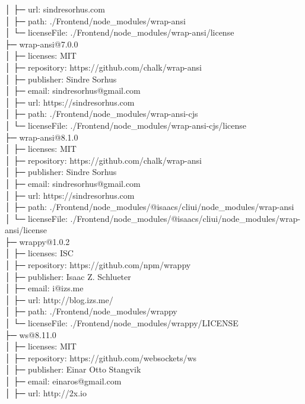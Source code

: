 │  ├─ url: sindresorhus.com\\
│  ├─ path: ./Frontend/node\_modules/wrap-ansi\\
│  └─ licenseFile: ./Frontend/node\_modules/wrap-ansi/license\\
├─ wrap-ansi@7.0.0\\
│  ├─ licenses: MIT\\
│  ├─ repository: https://github.com/chalk/wrap-ansi\\
│  ├─ publisher: Sindre Sorhus\\
│  ├─ email: sindresorhus@gmail.com\\
│  ├─ url: https://sindresorhus.com\\
│  ├─ path: ./Frontend/node\_modules/wrap-ansi-cjs\\
│  └─ licenseFile: ./Frontend/node\_modules/wrap-ansi-cjs/license\\
├─ wrap-ansi@8.1.0\\
│  ├─ licenses: MIT\\
│  ├─ repository: https://github.com/chalk/wrap-ansi\\
│  ├─ publisher: Sindre Sorhus\\
│  ├─ email: sindresorhus@gmail.com\\
│  ├─ url: https://sindresorhus.com\\
│  ├─ path: ./Frontend/node\_modules/@isaacs/cliui/node\_modules/wrap-ansi\\
│  └─ licenseFile: ./Frontend/node\_modules/@isaacs/cliui/node\_modules/wrap-ansi/license\\
├─ wrappy@1.0.2\\
│  ├─ licenses: ISC\\
│  ├─ repository: https://github.com/npm/wrappy\\
│  ├─ publisher: Isaac Z. Schlueter\\
│  ├─ email: i@izs.me\\
│  ├─ url: http://blog.izs.me/\\
│  ├─ path: ./Frontend/node\_modules/wrappy\\
│  └─ licenseFile: ./Frontend/node\_modules/wrappy/LICENSE\\
├─ ws@8.11.0\\
│  ├─ licenses: MIT\\
│  ├─ repository: https://github.com/websockets/ws\\
│  ├─ publisher: Einar Otto Stangvik\\
│  ├─ email: einaros@gmail.com\\
│  ├─ url: http://2x.io\\
